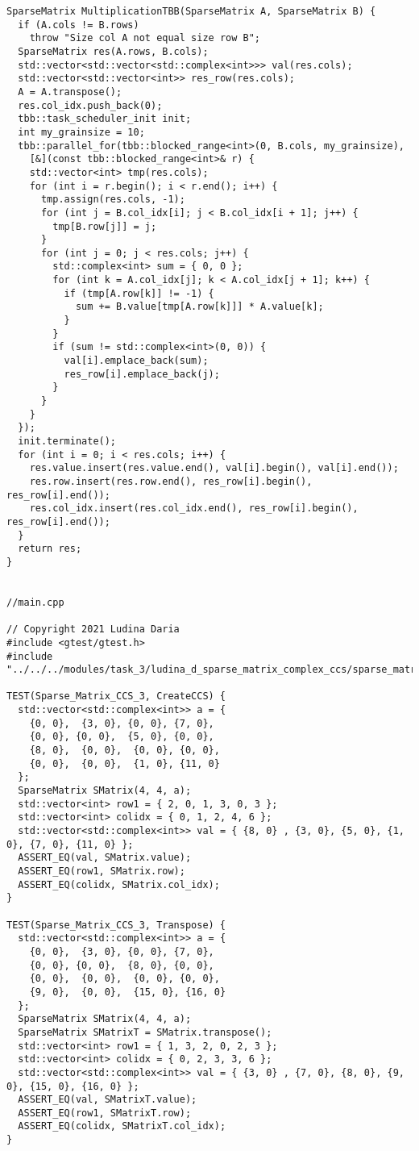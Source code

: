 \documentclass{report}
\begin{document}
\begin{lstlisting}
SparseMatrix MultiplicationTBB(SparseMatrix A, SparseMatrix B) {
  if (A.cols != B.rows)
    throw "Size col A not equal size row B";
  SparseMatrix res(A.rows, B.cols);
  std::vector<std::vector<std::complex<int>>> val(res.cols);
  std::vector<std::vector<int>> res_row(res.cols);
  A = A.transpose();
  res.col_idx.push_back(0);
  tbb::task_scheduler_init init;
  int my_grainsize = 10;
  tbb::parallel_for(tbb::blocked_range<int>(0, B.cols, my_grainsize),
    [&](const tbb::blocked_range<int>& r) {
    std::vector<int> tmp(res.cols);
    for (int i = r.begin(); i < r.end(); i++) {
      tmp.assign(res.cols, -1);
      for (int j = B.col_idx[i]; j < B.col_idx[i + 1]; j++) {
        tmp[B.row[j]] = j;
      }
      for (int j = 0; j < res.cols; j++) {
        std::complex<int> sum = { 0, 0 };
        for (int k = A.col_idx[j]; k < A.col_idx[j + 1]; k++) {
          if (tmp[A.row[k]] != -1) {
            sum += B.value[tmp[A.row[k]]] * A.value[k];
          }
        }
        if (sum != std::complex<int>(0, 0)) {
          val[i].emplace_back(sum);
          res_row[i].emplace_back(j);
        }
      }
    }
  });
  init.terminate();
  for (int i = 0; i < res.cols; i++) {
    res.value.insert(res.value.end(), val[i].begin(), val[i].end());
    res.row.insert(res.row.end(), res_row[i].begin(), res_row[i].end());
    res.col_idx.insert(res.col_idx.end(), res_row[i].begin(), res_row[i].end());
  }
  return res;
}


//main.cpp

// Copyright 2021 Ludina Daria
#include <gtest/gtest.h>
#include "../../../modules/task_3/ludina_d_sparse_matrix_complex_ccs/sparse_matrix_complex_ccs.h"

TEST(Sparse_Matrix_CCS_3, CreateCCS) {
  std::vector<std::complex<int>> a = {
    {0, 0},  {3, 0}, {0, 0}, {7, 0},
    {0, 0}, {0, 0},  {5, 0}, {0, 0},
    {8, 0},  {0, 0},  {0, 0}, {0, 0},
    {0, 0},  {0, 0},  {1, 0}, {11, 0}
  };
  SparseMatrix SMatrix(4, 4, a);
  std::vector<int> row1 = { 2, 0, 1, 3, 0, 3 };
  std::vector<int> colidx = { 0, 1, 2, 4, 6 };
  std::vector<std::complex<int>> val = { {8, 0} , {3, 0}, {5, 0}, {1, 0}, {7, 0}, {11, 0} };
  ASSERT_EQ(val, SMatrix.value);
  ASSERT_EQ(row1, SMatrix.row);
  ASSERT_EQ(colidx, SMatrix.col_idx);
}

TEST(Sparse_Matrix_CCS_3, Transpose) {
  std::vector<std::complex<int>> a = {
    {0, 0},  {3, 0}, {0, 0}, {7, 0},
    {0, 0}, {0, 0},  {8, 0}, {0, 0},
    {0, 0},  {0, 0},  {0, 0}, {0, 0},
    {9, 0},  {0, 0},  {15, 0}, {16, 0}
  };
  SparseMatrix SMatrix(4, 4, a);
  SparseMatrix SMatrixT = SMatrix.transpose();
  std::vector<int> row1 = { 1, 3, 2, 0, 2, 3 };
  std::vector<int> colidx = { 0, 2, 3, 3, 6 };
  std::vector<std::complex<int>> val = { {3, 0} , {7, 0}, {8, 0}, {9, 0}, {15, 0}, {16, 0} };
  ASSERT_EQ(val, SMatrixT.value);
  ASSERT_EQ(row1, SMatrixT.row);
  ASSERT_EQ(colidx, SMatrixT.col_idx);
}


\end{lstlisting}
\end{document}
